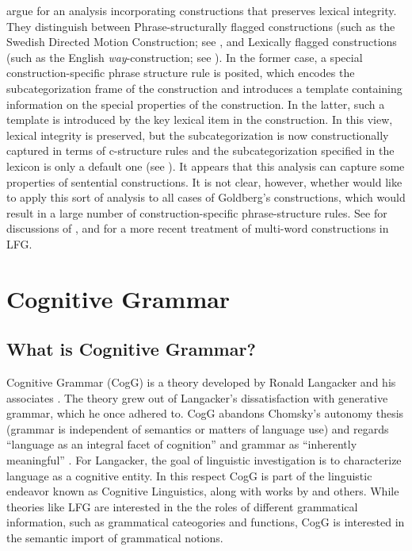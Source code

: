 \documentclass[output=paper,japanesefont,hidelinks]{langscibook}
\begin{document}
\citet{asudeh2013constructions} argue for an analysis incorporating constructions that preserves lexical integrity. They distinguish between Phrase-structural\-ly flagged constructions (such as the Swedish Directed Motion Construction; see , and Lexically flagged constructions (such as the English \textit{way}-construction; see \citet[Chapter~9]{goldberg1995constructions}). In the former case, a special construction-specific phrase structure rule is posited, which encodes the subcategorization frame of the construction and introduces a template containing information on the special properties of the construction. In the latter, such a template is introduced by the key lexical item in the construction. In this view, lexical integrity is preserved, but the subcategorization is now constructionally captured in terms of c-structure rules and the subcategorization specified in the lexicon is only a default one (see \citealt[27--29]{asudeh2013constructions}). It appears that this analysis can capture some properties of sentential constructions. It is not clear, however, whether \citet{asudeh2013constructions} would like to apply this sort of analysis to all cases of Goldberg's constructions, which would result in a large number of construction-specific phrase-structure rules.  See \citet{MuellerLFGphrasal} for discussions of \citet{asudeh2013constructions}, and \citet{findlay2019} for a more recent treatment of multi-word constructions in LFG.

\section{Cognitive Grammar}
\label{sec:cg:3}

\subsection{What is Cognitive Grammar?}
\label{sec:cg:3.1}

Cognitive Grammar (CogG) is a theory developed by Ronald Langacker and his associates \citep[][etc.]{Langacker1987,Langacker1990,Langacker1991,Langacker1999,Langacker2008,Langacker2009,VanHoek1995,KumashiroLangacker2003}. The theory grew out of Langacker's dissatisfaction with generative grammar, which he once adhered to. CogG abandons Chomsky's autonomy thesis (grammar is independent of semantics or matters of language use) and regards ``language as an integral facet of cognition'' and grammar as ``inherently meaningful'' \citep[509]{Langacker1987}. For Langacker, the goal of linguistic investigation is to characterize language as a cognitive entity. In this respect CogG is part of the linguistic endeavor known as Cognitive Linguistics, along with works by \citet{Lakoff1987} and others. While theories like LFG are interested in the the roles of different grammatical information, such as grammatical cateogories and functions, CogG is interested in the semantic import of grammatical notions.
\end{document}
